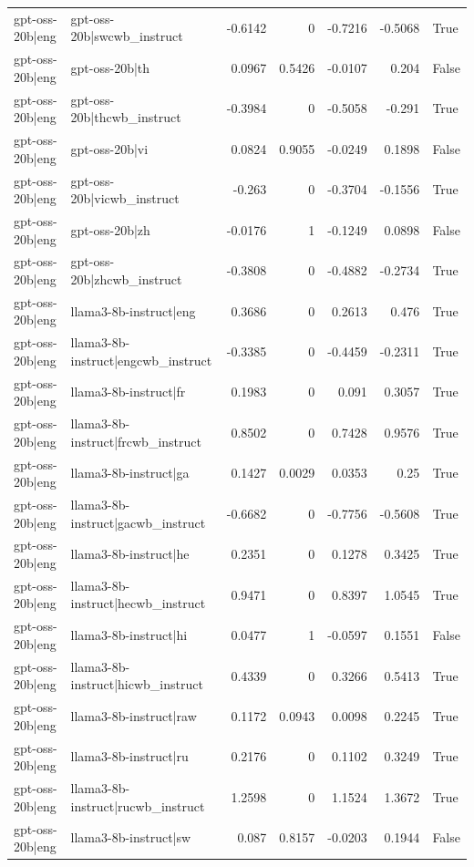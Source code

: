 \begin{table}
\begin{tabular}{l l r r r r l}
gpt-oss-20b|eng & gpt-oss-20b|swcwb_instruct & -0.6142 & 0 & -0.7216 & -0.5068 & True \\
gpt-oss-20b|eng & gpt-oss-20b|th & 0.0967 & 0.5426 & -0.0107 & 0.204 & False \\
gpt-oss-20b|eng & gpt-oss-20b|thcwb_instruct & -0.3984 & 0 & -0.5058 & -0.291 & True \\
gpt-oss-20b|eng & gpt-oss-20b|vi & 0.0824 & 0.9055 & -0.0249 & 0.1898 & False \\
gpt-oss-20b|eng & gpt-oss-20b|vicwb_instruct & -0.263 & 0 & -0.3704 & -0.1556 & True \\
gpt-oss-20b|eng & gpt-oss-20b|zh & -0.0176 & 1 & -0.1249 & 0.0898 & False \\
gpt-oss-20b|eng & gpt-oss-20b|zhcwb_instruct & -0.3808 & 0 & -0.4882 & -0.2734 & True \\
gpt-oss-20b|eng & llama3-8b-instruct|eng & 0.3686 & 0 & 0.2613 & 0.476 & True \\
gpt-oss-20b|eng & llama3-8b-instruct|engcwb_instruct & -0.3385 & 0 & -0.4459 & -0.2311 & True \\
gpt-oss-20b|eng & llama3-8b-instruct|fr & 0.1983 & 0 & 0.091 & 0.3057 & True \\
gpt-oss-20b|eng & llama3-8b-instruct|frcwb_instruct & 0.8502 & 0 & 0.7428 & 0.9576 & True \\
gpt-oss-20b|eng & llama3-8b-instruct|ga & 0.1427 & 0.0029 & 0.0353 & 0.25 & True \\
gpt-oss-20b|eng & llama3-8b-instruct|gacwb_instruct & -0.6682 & 0 & -0.7756 & -0.5608 & True \\
gpt-oss-20b|eng & llama3-8b-instruct|he & 0.2351 & 0 & 0.1278 & 0.3425 & True \\
gpt-oss-20b|eng & llama3-8b-instruct|hecwb_instruct & 0.9471 & 0 & 0.8397 & 1.0545 & True \\
gpt-oss-20b|eng & llama3-8b-instruct|hi & 0.0477 & 1 & -0.0597 & 0.1551 & False \\
gpt-oss-20b|eng & llama3-8b-instruct|hicwb_instruct & 0.4339 & 0 & 0.3266 & 0.5413 & True \\
gpt-oss-20b|eng & llama3-8b-instruct|raw & 0.1172 & 0.0943 & 0.0098 & 0.2245 & True \\
gpt-oss-20b|eng & llama3-8b-instruct|ru & 0.2176 & 0 & 0.1102 & 0.3249 & True \\
gpt-oss-20b|eng & llama3-8b-instruct|rucwb_instruct & 1.2598 & 0 & 1.1524 & 1.3672 & True \\
gpt-oss-20b|eng & llama3-8b-instruct|sw & 0.087 & 0.8157 & -0.0203 & 0.1944 & False \\

\end{tabular}
\end{table}
